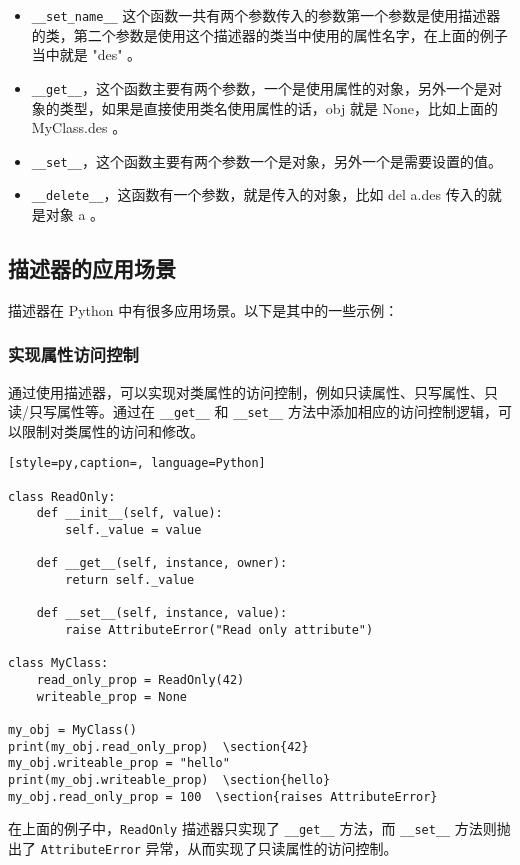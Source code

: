 \begin{itemize}
\item \verb|__set_name__| 这个函数一共有两个参数传入的参数第一个参数是使用描述器的类，第二个参数是使用这个描述器的类当中使用的属性名字，在上面的例子当中就是 "des" 。 
\item \verb|__get__|，这个函数主要有两个参数，一个是使用属性的对象，另外一个是对象的类型，如果是直接使用类名使用属性的话，obj 就是 None，比如上面的 MyClass.des 。 
\item \verb|__set__|，这个函数主要有两个参数一个是对象，另外一个是需要设置的值。 
\item \verb|__delete__|，这函数有一个参数，就是传入的对象，比如 del a.des 传入的就是对象 a 。 
\end{itemize}
\subsection{描述器的应用场景}
描述器在 Python 中有很多应用场景。以下是其中的一些示例：
\subsubsection{实现属性访问控制}
通过使用描述器，可以实现对类属性的访问控制，例如只读属性、只写属性、只读/只写属性等。通过在 \verb|__get__| 和 \verb|__set__| 方法中添加相应的访问控制逻辑，可以限制对类属性的访问和修改。
\begin{lstlisting}[style=py,caption=, language=Python]

class ReadOnly:
    def __init__(self, value):
        self._value = value
    
    def __get__(self, instance, owner):
        return self._value
    
    def __set__(self, instance, value):
        raise AttributeError("Read only attribute")
        
class MyClass:
    read_only_prop = ReadOnly(42)
    writeable_prop = None
    
my_obj = MyClass()
print(my_obj.read_only_prop)  \section{42}
my_obj.writeable_prop = "hello"
print(my_obj.writeable_prop)  \section{hello}
my_obj.read_only_prop = 100  \section{raises AttributeError}
\end{lstlisting}
在上面的例子中，\verb|ReadOnly| 描述器只实现了 \verb|__get__| 方法，而 \verb|__set__| 方法则抛出了 \verb|AttributeError| 异常，从而实现了只读属性的访问控制。
